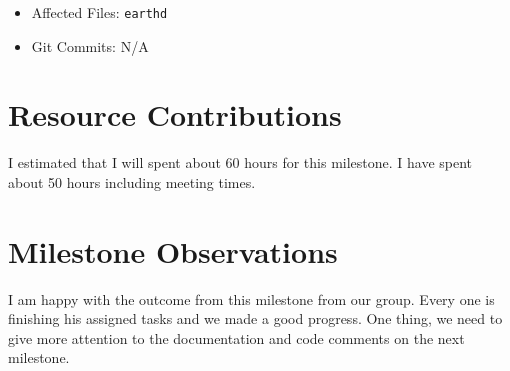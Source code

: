 \documentclass{article}
\begin{document}
\begin{itemize}
\begin{itemize}
            \item Affected Files: \texttt{earthd}
            \item Git Commits: N/A
        \end{itemize}
    \end{itemize}
\newpage
\section*{Resource Contributions}
I estimated that I will spent about 60 hours for this milestone. I have spent about 50 hours including meeting times. 


\section*{Milestone Observations}
I am happy with the outcome from this milestone from our group. Every one is finishing his assigned tasks and we made a good progress. One thing, we need to give more attention to the documentation and code comments on the next milestone.
\end{document}
